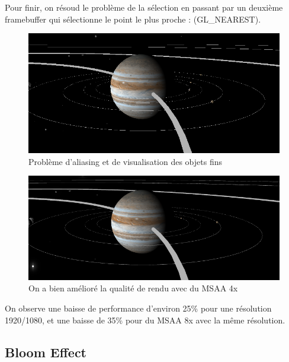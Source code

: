 \documentclass[11pt,a4paper]{article}
\begin{document}
Pour finir, on résoud le problème de la sélection en passant par un deuxième framebuffer qui sélectionne le point le plus proche : (\textsc{GL\_NEAREST}).
\begin{figure}[h!]
\centering
\includegraphics[width=0.70\columnwidth]{img/a.png}
\caption{Problème d'aliasing et de visualisation des objets fins}
\end{figure}

\begin{figure}[h!]
\centering
\includegraphics[width=0.70\columnwidth]{img/aa.png}
\caption{On a bien amélioré la qualité de rendu avec du MSAA 4x}
\end{figure}

On observe une baisse de performance d'environ 25\% pour une résolution 1920/1080, et une baisse de 35\% pour du MSAA 8x avec la même résolution.

\subsection{Bloom Effect}
\end{document}
